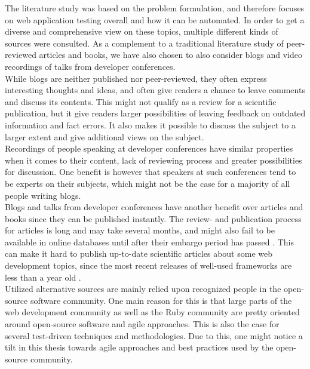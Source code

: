 
The literature study was based on the problem formulation, and therefore
focuses on web application testing overall and how it can be automated.
In order to get a diverse and comprehensive view on these topics,
multiple different kinds of sources were consulted. As a complement to a
traditional literature study of peer-reviewed articles and books, we
have also chosen to also consider blogs and video recordings of
talks from developer conferences.\\

While blogs are neither published nor peer-reviewed, they often express
interesting thoughts and ideas, and often give readers a chance to leave
comments and discuss its contents. This might not qualify as a review
for a scientific publication, but it give readers larger possibilities
of leaving feedback on outdated information and fact errors. It also
makes it possible to discuss the subject to a larger extent and give
additional views on the subject.\\

Recordings of people speaking at developer conferences have similar
properties when it comes to their content, lack of reviewing process and
greater possibilities for discussion. One benefit is however that speakers
at such conferences tend to be experts on their subjects, which might
not be the case for a majority of all people writing blogs.\\

Blogs and talks from developer conferences have another benefit
over articles and books since they can be published instantly. The
review- and publication process for articles is long and may take
several months, and might also fail to be available in online databases
until after their embargo period has passed \cite{wiki:embargo,
pdf:publishing}. This can make it hard to publish up-to-date scientific
articles about some web development topics, since the most recent
releases of well-used frameworks are less than a year old
\cite{wiki:rails_versions, wiki:django_versions,
web:knockout_versions}.\\

Utilized alternative sources are mainly relied upon recognized people in
the open-source software community. One main reason for this is that
large parts of the web development community as well as the Ruby
community are pretty oriented around open-source software and agile
approaches. This is also the case for several test-driven techniques and
methodologies. Due to this, one might notice a tilt in this thesis
towards agile approaches and best practices used by the open-source
community.\\
